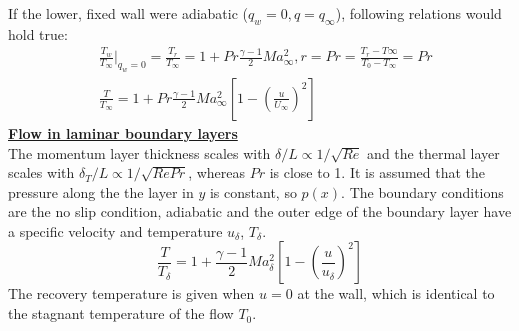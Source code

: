 \documentclass[8pt, landscape, fleqn]{scrartcl}
\begin{document}
\begin{multicols*}{3}
If the lower, fixed wall were adiabatic ($q_w = 0, q = q_\infty$), following relations would hold true:
\begin{align*}
    &\frac{T_w}{T_\infty}\vert_{q_w = 0} = \frac{T_r}{T_\infty} = 1 + Pr \frac{\gamma-1}{2}Ma_\infty^2, r = Pr = \frac{T_r-T\infty}{T_0-T_\infty} = Pr \\
    &\frac{T}{T_\infty} = 1 + Pr \frac{\gamma-1}{2}Ma_\infty^2\left[ 1- \left(  \frac{u}{U_\infty}\right)^2 \right]
\end{align*}
\underline{\textbf{Flow in laminar boundary layers}} \\
The momentum layer thickness scales with $\delta / L \propto 1 / \sqrt{Re}$ and the thermal layer scales with $\delta_T / L\propto 1/\sqrt{Re Pr}$, whereas $Pr$ is close to 1. It is assumed that the pressure along the the layer in $y$ is constant, so $p(x)$. The boundary conditions are the no slip condition, adiabatic and the outer edge of the boundary layer have a specific velocity and temperature $u_{\delta}$, $T_\delta$.
\begin{equation*}
    \frac{T}{T_\delta} = 1 + \frac{\gamma-1}{2}Ma_\delta^2\left[ 1- \left( \frac{u}{u_\delta}\right)^2 \right]
\end{equation*} 
The recovery temperature is given when $u=0$ at the wall, which is identical to the stagnant temperature of the flow $T_0$.


\end{multicols*}
\end{document}
